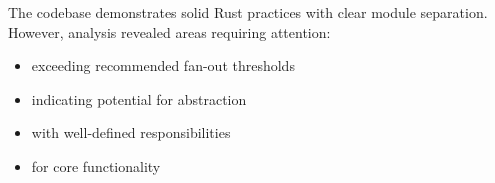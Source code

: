 The codebase demonstrates solid Rust practices with clear module separation. However, analysis revealed areas requiring attention:

\begin{itemize}
    \item {} exceeding recommended fan-out thresholds
    \item {} indicating potential for abstraction
    \item {} with well-defined responsibilities
    \item {} for core functionality
\end{itemize}
